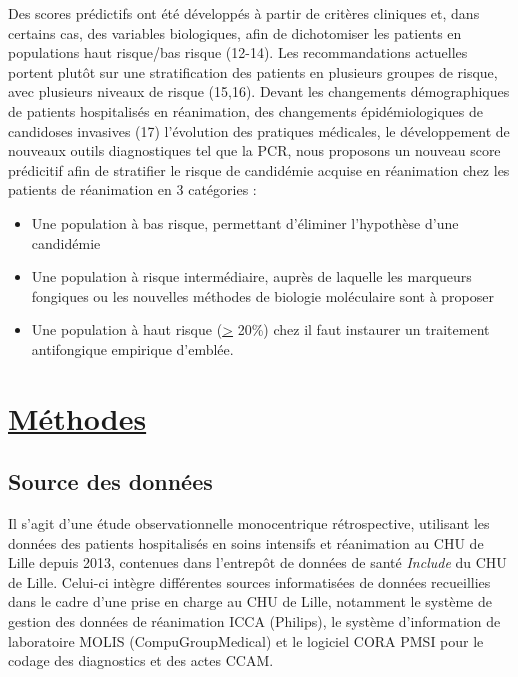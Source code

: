 \documentclass[
  french,
  letterpaper,
  DIV=11,
  numbers=noendperiod,
  justified]{scrartcl}
\begin{document}
Des scores prédictifs ont été développés à partir de critères cliniques
et, dans certains cas, des variables biologiques, afin de dichotomiser
les patients en populations haut risque/bas risque (12-14). Les
recommandations actuelles portent plutôt sur une stratification des
patients en plusieurs groupes de risque, avec plusieurs niveaux de
risque (15,16). Devant les changements démographiques de patients
hospitalisés en réanimation, des changements épidémiologiques de
candidoses invasives (17) l'évolution des pratiques médicales, le
développement de nouveaux outils diagnostiques tel que la PCR, nous
proposons un nouveau score prédicitif afin de stratifier le risque de
candidémie acquise en réanimation chez les patients de réanimation en 3
catégories :

\begin{itemize}
\item
  Une population à bas risque, permettant d'éliminer l'hypothèse d'une
  candidémie
\item
  Une population à risque intermédiaire, auprès de laquelle les
  marqueurs fongiques ou les nouvelles méthodes de biologie moléculaire
  sont à proposer
\item
  Une population à haut risque (\ul{\textgreater{}} 20\%) chez il faut
  instaurer un traitement antifongique empirique d'emblée.
\end{itemize}

\section{\texorpdfstring{\ul{Méthodes}}{Méthodes}}\label{muxe9thodes}

\subsection{Source des données}\label{source-des-donnuxe9es}

Il s'agit d'une étude observationnelle monocentrique rétrospective,
utilisant les données des patients hospitalisés en soins intensifs et
réanimation au CHU de Lille depuis 2013, contenues dans l'entrepôt de
données de santé \emph{Include} du CHU de Lille. Celui-ci intègre
différentes sources informatisées de données recueillies dans le cadre
d'une prise en charge au CHU de Lille, notamment le système de gestion
des données de réanimation ICCA (Philips), le système d'information de
laboratoire MOLIS (CompuGroupMedical) et le logiciel CORA PMSI pour le
codage des diagnostics et des actes CCAM.
\end{document}
